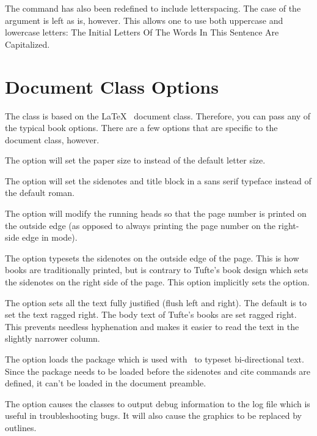 The  command has also been redefined to include
letterspacing.  The case of the  argument is left as is,
however.  This allows one to use both uppercase and lowercase letters:
The Initial Letters Of The Words In This Sentence Are Capitalized.



\section{Document Class Options}\label{sec:options}

The  class is based on the \LaTeX\ 
document class.  Therefore, you can pass any of the typical book
options.  There are a few options that are specific to the
 document class, however.

The  option will set the paper size to  instead of
the default  letter size.

The  option will set the sidenotes and title block in a 
\textsf{sans serif} typeface instead of the default roman.

The  option will modify the running heads so that the page
number is printed on the outside edge (as opposed to always printing the page
number on the right-side edge in  mode).  

The  option typesets the sidenotes on the outside edge of
the page.  This is how books are traditionally printed, but is contrary to
Tufte's book design which sets the sidenotes on the right side of the page.
This option implicitly sets the  option.

The  option sets all the text fully justified (flush left
and right).  The default is to set the text ragged right.  
The body text of Tufte's books are set ragged right.  This prevents
needless hyphenation and makes it easier to read the text in the slightly
narrower column.

The  option loads the  package which is used with
\tXeLaTeX\ to typeset bi-directional text.  Since the 
package needs to be loaded before the sidenotes and cite commands are defined,
it can't be loaded in the document preamble.

The  option causes the \TL classes to output debug
information to the log file which is useful in troubleshooting bugs.  It will
also cause the graphics to be replaced by outlines.

